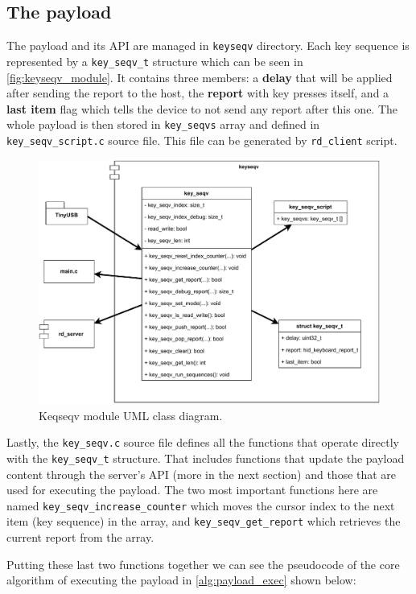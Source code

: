 \subsection{The payload}
\label{ssec:payload}
The payload and its API are managed in \verb|keyseqv| directory. Each key sequence is represented by a \verb|key_seqv_t| structure which can be seen in \autoref{fig:keyseqv_module}. It contains three members: a \textbf{delay} that will be applied after sending the report to the host, the \textbf{report} with key presses itself, and a \textbf{last item} flag which tells the device to not send any report after this one. The whole payload is then stored in \verb|key_seqvs| array and defined in \verb|key_seqv_script.c| source file. This file can be generated by \verb|rd_client| script.
\begin{figure}[ht]
    \centering
    \includegraphics[width=0.8\linewidth]{./obrazky-figures/keyseqv_module.pdf}
    \caption{Keqseqv module UML class diagram.}
    \label{fig:keyseqv_module}
\end{figure}

Lastly, the \verb|key_seqv.c| source file defines all the functions that operate directly with the \verb|key_seqv_t| structure. That includes functions that update the payload content through the server's API (more in the next section) and those that are used for executing the payload. The two most important functions here are named \verb|key_seqv_increase_counter| \linebreak which moves the cursor index to the next item (key sequence) in the array, and \linebreak\verb|key_seqv_get_report| which retrieves the current report from the array.

Putting these last two functions together we can see the pseudocode of the core algorithm of executing the payload in \autoref{alg:payload_exec} shown below:

